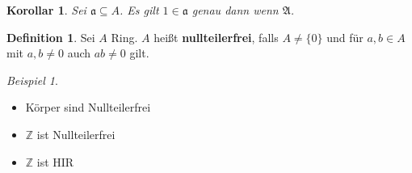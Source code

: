 \documentclass[10pt,a4paper]{article}
\newcommand{\Z}{\ensuremath{\mathbb{Z}}}
\newcounter{thm}[section]
\theoremstyle{definition}
\newtheorem{definition}[thm]{Definition}
\theoremstyle{plain}
\newtheorem{kor}[thm]{Korollar}
\theoremstyle{remark}
\newtheorem{exm}[thm]{Beispiel}
\begin{document}
\begin{kor}
	Sei $\mathfrak a\subseteq A$. Es gilt $1\in\mathfrak a$ genau dann wenn $\mathfrak A$.
\end{kor}

\begin{definition}
	Sei $A$ Ring. $A$ heißt \textbf{nullteilerfrei}, falls $A\neq\{0\}$ und für $a,b\in A$ mit $a,b\neq 0$ auch $ab\neq0$ gilt.
\end{definition}
\begin{exm}
	\begin{itemize}
		\item Körper sind Nullteilerfrei
		
		\item $\Z$ ist Nullteilerfrei
		\item $\Z$ ist HIR
	\end{itemize}
\end{exm}
\end{document}
